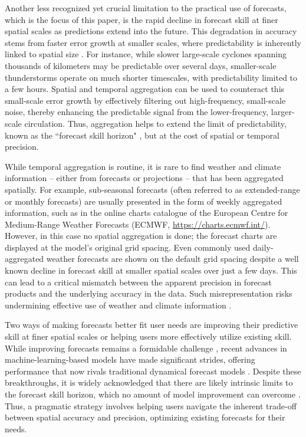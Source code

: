 \documentclass[preprint,12pt,authoryear]{elsarticle}
\begin{document}
Another less recognized yet crucial limitation to the practical use of forecasts, which is the focus of this paper, is the rapid decline in forecast skill at finer spatial scales as predictions extend into the future. This degradation in accuracy stems from faster error growth at smaller scales, where predictability is inherently linked to spatial size \citep{Lorenz1969, TothBuizza2019}. For instance, while slower large-scale cyclones spanning thousands of kilometers may be predictable over several days, smaller-scale thunderstorms operate on much shorter timescales, with predictability limited to a few hours. Spatial and temporal aggregation can be used to counteract this small-scale error growth by effectively filtering out high-frequency, small-scale noise, thereby enhancing the predictable signal from the lower-frequency, larger-scale circulation. Thus, aggregation helps to extend the limit of predictability, known as the ``forecast skill horizon" \citep{Buizza2015,BuizzLeutbecher2015}, but at the cost of spatial or temporal precision.





While temporal aggregation is routine, it is rare to find weather and climate information -- either from forecasts or projections -- that has been aggregated spatially. For example, sub-seasonal forecasts (often referred to as extended-range or monthly forecasts) are usually presented in the form of weekly aggregated information, such as in the online charts catalogue of the European Centre for Medium-Range Weather Forecasts (ECMWF, \url{https://charts.ecmwf.int/}). However, in this case no spatial aggregation is done; the forecast charts are displayed at the model's original grid spacing. Even commonly used daily-aggregated weather forecasts are shown on the default grid spacing despite a well known decline in forecast skill at smaller spatial scales over just a few days. This can lead to a critical mismatch between the apparent precision in forecast products and the underlying accuracy in the data. Such misrepresentation risks undermining effective use of weather and climate information \citep{Nissan2019, Fiedler2021}. 


Two ways of making forecasts better fit user needs are improving their predictive skill at finer spatial scales or helping users more effectively utilize existing skill. While improving forecasts remains a formidable challenge \citep{Bauer2015, Benjamin2019}, recent advances in machine-learning-based models have made significant strides, offering performance that now rivals traditional dynamical forecast models \citep{Lam2023, Benbouallegue2024, Price2024}. Despite these breakthroughs, it is widely acknowledged that there are likely intrinsic limits to the forecast skill horizon, which no amount of model improvement can overcome \citep{Lorenz1969, Palmer2014}. Thus, a pragmatic strategy involves helping users navigate the inherent trade-off between spatial accuracy and precision, optimizing existing forecasts for their needs.
\end{document}
